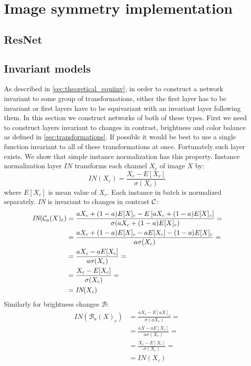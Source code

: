 \section{Image symmetry implementation}

\subsection{ResNet}
\subsection{Invariant models}
As described in \ref{sec:theoretical_equiinv}, in order to construct a network
invariant to some group of transformations, either the first layer has to be
invariant or first layers have to be equivariant with an invariant layer
following them. In this section we construct networks of both of these types.
First we need to construct layers invariant to changes in
contrast, brightness and color balance as defined in
\ref{sec:transformations}. If possible it would be best to use a single function
invariant to all of these transformations at once. Fortunately such layer
exists. We show that simple instance normalization has this property.
Instance normalization layer $\textit{IN}$ transforms each channel
$X_c$ of image $X$ by:
$$ \mathit{IN}(X_c) = \frac{X_c-E[X_c]}{\sigma(X_c)} $$
where $E[X_c]$ is mean value of $X_c$.
Each instance in batch is normalized separately.
\textit{IN} is invariant to changes in contrast $\mathcal{C}$:
\begin{align*}
    \textit{IN}(\mathcal{C}_a(X)_c) &=
    \frac{aX_c+(1-a)E[X]_c - E\left[aX_c+(1-a)E[X]_c\right]}{\sigma(aX_c+(1-a)E[X]_c)} = \\
    &= \frac{aX_c+(1-a)E[X]_c - aE[X_c]-(1-a)E[X]_c}{a\sigma(X_c)} = \\
    &= \frac{aX_c-aE[X_c]}{a\sigma(X_c)} = \\
    &= \frac{X_c-E[X_c]}{\sigma(X_c)} = \\
    &= \textit{IN}(X_c)
\end{align*}
Similarly for brightness changes $\mathcal{B}$:
\begin{align*}
    \textit{IN}(\mathcal{B}_a(X)_c) &=
    \frac{aX_c - E\left[aX\right]_c}{\sigma(aX_c)} = \\
    &= \frac{aX-aE[X_c]}{a\sigma(X_c)} = \\
    &= \frac{X_c-E[X_c]}{\sigma(X_c)} = \\
    &= \textit{IN}(X_c)
\end{align*}
